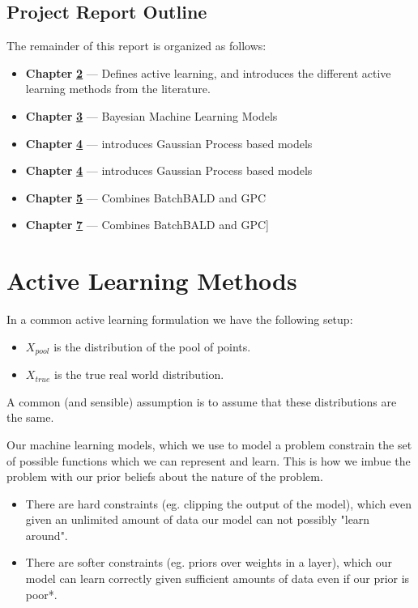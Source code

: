 \documentclass[12pt, a4paper]{report}
\theoremstyle{definition}
\theoremstyle{definition}
\theoremstyle{definition}
\begin{document}
\section{Project Report Outline}
The remainder of this report is organized as follows:
\begin{itemize}
    \item[] \textbf{Chapter} \hyperref[sec:ActiveLearning]{\textbf{2}} --- Defines active learning, and introduces the different active learning methods from the literature.
    \item[] \textbf{Chapter} \hyperref[sec:Models]{\textbf{3}} --- Bayesian Machine Learning Models
    \item[] \textbf{Chapter} \hyperref[sec:DUE]{\textbf{4}} --- introduces Gaussian Process based models
    \item[] \textbf{Chapter} \hyperref[sec:ActiveLearningWithDUE]{\textbf{4}} --- introduces Gaussian Process based models 
    \item[] \textbf{Chapter} \hyperref[sec:Implementation]{\textbf{5}} --- Combines BatchBALD and GPC
    \item[] \textbf{Chapter} \hyperref[sec:Experiments]{\textbf{7}} --- Combines BatchBALD and GPC] 
\end{itemize}


\chapter{Active Learning Methods}
\label{sec:ActiveLearning}

In a common active learning formulation we have the following setup:

\begin{itemize}
    \item $X_{pool}$  is the distribution of the pool of points.
    \item $X_{true}$  is the true real world distribution.
\end{itemize}

A common (and sensible) assumption is to assume that these distributions are the same.

Our machine learning models, which we use to model a problem constrain the set of possible functions which we can represent and learn. This is how we imbue the problem with our prior beliefs about the nature of the problem.

\begin{itemize}
    \item There are hard constraints (eg. clipping the output of the model), which even given an unlimited amount of data our model can not possibly "learn around".
    \item There are softer constraints (eg. priors over weights in a layer), which our model can learn correctly given sufficient amounts of data even if our prior is poor*.
\end{itemize}
\end{document}
